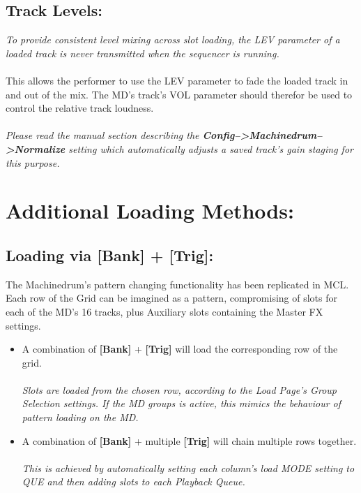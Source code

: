 \section{Track Levels:}
\textit{To provide consistent level mixing across slot loading, the LEV parameter of a loaded track is never transmitted when the sequencer is running.}\\\\This allows the performer to use the LEV parameter to fade the loaded track in and out of the mix. The MD's track's VOL parameter should therefor be used to control the relative track loudness.\\\\
\textit{Please read the manual section describing the \textbf{Config-->Machinedrum-->Normalize} setting which automatically adjusts a saved track's gain staging for this purpose.}

\chapter{Additional Loading Methods:}
\section{Loading via [Bank] + [Trig]:}
The Machinedrum's pattern changing functionality has been replicated in MCL. Each row of the Grid can be imagined as a pattern, compromising of slots for each of the MD's 16 tracks, plus Auxiliary slots containing the Master FX settings.

\begin{itemize}
   \item A combination of \textbf{[Bank]} + \textbf{[Trig]} will load the corresponding row of the grid.\\\\ \textit{Slots are loaded from the chosen row, according to the Load Page's Group Selection settings. If the MD groups is active, this mimics the behaviour of pattern loading on the MD.}
   \item A combination of \textbf{[Bank]} + multiple \textbf{[Trig]} will chain multiple rows together.\\\\\textit{This is achieved by automatically setting each column's load MODE setting to QUE and then adding slots to each Playback Queue.}
\end{itemize}
